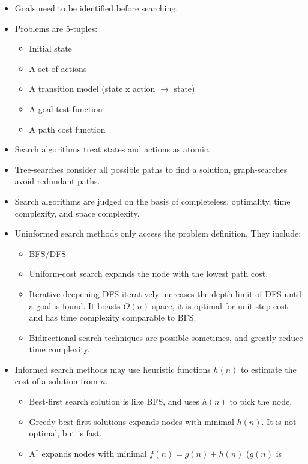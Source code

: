 \begin{itemize}
    \item Goals need to be identified before searching.
    \item Problems are 5-tuples:
        \begin{itemize}
            \item Initial state
            \item A set of actions
            \item A transition model (state x action $\rightarrow$ state)
            \item A goal test function
            \item A path cost function
        \end{itemize}
    \item Search algorithms treat states and actions as atomic.
    \item Tree-searches consider all possible paths to find a solution,
    graph-searches avoid redundant paths.
    \item Search algorithms are judged on the basis of completeless, optimality,
    time complexity, and space complexity.
    \item Uninformed search methods only access the problem definition. They
    include:
        \begin{itemize}
            \item BFS/DFS
            \item Uniform-cost search expands the node with the lowest path
            cost.
            \item Iterative deepening DFS iteratively increases the depth limit
            of DFS until a goal is found. It boasts $O(n)$ space, it is optimal
            for unit step cost and has time complexity comparable to BFS.
            \item Bidirectional search techniques are possible sometimes, and
            greatly reduce time complexity.
        \end{itemize}
    \item Informed search methods may use heuristic functions $h(n)$ to estimate
    the cost of a solution from $n$.
    \begin{itemize}
        \item Best-first search solution is like BFS, and uses $h(n)$ to pick
        the node.
        \item Greedy best-first solutions expands nodes with minimal $h(n)$. It
        is not optimal, but is fast.
        \item A$^*$ expands nodes with minimal $f(n) = g(n) + h(n)$ ($g(n)$ is

\end{itemize}
\end{itemize}
